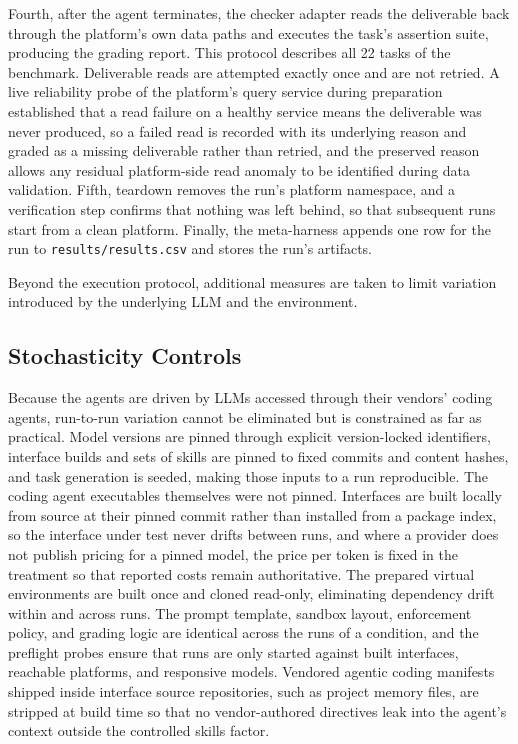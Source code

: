 \documentclass[
english,                 %
bibtex,                  %
]{kththesis}
\numberwithin{listing}{chapter}
\begin{document}
Fourth, after the agent terminates, the checker adapter reads the deliverable back through the platform's own data paths and executes the task's assertion suite, producing the grading report. This protocol describes all 22 tasks of the benchmark. Deliverable reads are attempted exactly once and are not retried. A live reliability probe of the platform's query service during preparation established that a read failure on a healthy service means the deliverable was never produced, so a failed read is recorded with its underlying reason and graded as a missing deliverable rather than retried, and the preserved reason allows any residual platform-side read anomaly to be identified during data validation. Fifth, teardown removes the run's platform namespace, and a verification step confirms that nothing was left behind, so that subsequent runs start from a clean platform. Finally, the meta-harness appends one row for the run to \texttt{results/results.csv} and stores the run's artifacts.

Beyond the execution protocol, additional measures are taken to limit variation introduced by the underlying \gls{LLM} and the environment.

\subsection{Stochasticity Controls}
\label{sec:method_stochasticity_controls}
\glsresetall

Because the agents are driven by \glspl{LLM} accessed through their vendors' coding agents, run-to-run variation cannot be eliminated but is constrained as far as practical. Model versions are pinned through explicit version-locked identifiers, interface builds and sets of skills are pinned to fixed commits and content hashes, and task generation is seeded, making those inputs to a run reproducible. The coding agent executables themselves were not pinned. Interfaces are built locally from source at their pinned commit rather than installed from a package index, so the interface under test never drifts between runs, and where a provider does not publish pricing for a pinned model, the price per token is fixed in the treatment so that reported costs remain authoritative. The prepared virtual environments are built once and cloned read-only, eliminating dependency drift within and across runs. The prompt template, sandbox layout, enforcement policy, and grading logic are identical across the runs of a condition, and the preflight probes ensure that runs are only started against built interfaces, reachable platforms, and responsive models. Vendored agentic coding manifests shipped inside interface source repositories, such as project memory files, are stripped at build time so that no vendor-authored directives leak into the agent's context outside the controlled skills factor.
\end{document}
